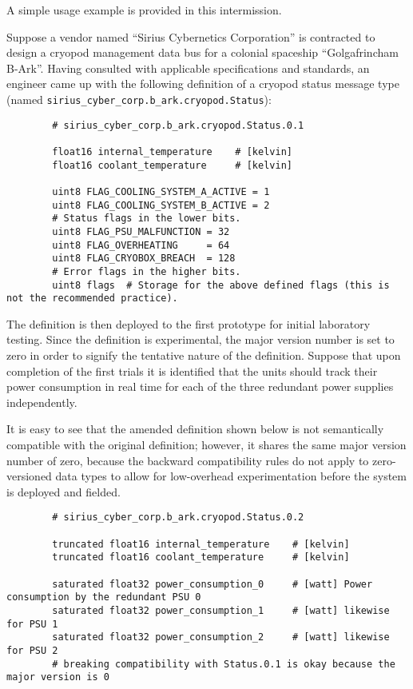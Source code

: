 \begin{remark}[breakable]
    A simple usage example is provided in this intermission.

    Suppose a vendor named ``Sirius Cybernetics Corporation'' is contracted to design a
    cryopod management data bus for a colonial spaceship ``Golgafrincham B-Ark''.
    Having consulted with applicable specifications and standards, an engineer came up with the following
    definition of a cryopod status message type (named \verb|sirius_cyber_corp.b_ark.cryopod.Status|):

    \begin{verbatim}
        # sirius_cyber_corp.b_ark.cryopod.Status.0.1

        float16 internal_temperature    # [kelvin]
        float16 coolant_temperature     # [kelvin]

        uint8 FLAG_COOLING_SYSTEM_A_ACTIVE = 1
        uint8 FLAG_COOLING_SYSTEM_B_ACTIVE = 2
        # Status flags in the lower bits.
        uint8 FLAG_PSU_MALFUNCTION = 32
        uint8 FLAG_OVERHEATING     = 64
        uint8 FLAG_CRYOBOX_BREACH  = 128
        # Error flags in the higher bits.
        uint8 flags  # Storage for the above defined flags (this is not the recommended practice).
    \end{verbatim}

    The definition is then deployed to the first prototype for initial laboratory testing.
    Since the definition is experimental, the major version number is set to zero in order to signify the
    tentative nature of the definition.
    Suppose that upon completion of the first trials it is identified that the units should track their
    power consumption in real time for each of the three redundant power supplies independently.

    It is easy to see that the amended definition shown below is not semantically compatible
    with the original definition; however, it shares the same major version number of zero, because the backward
    compatibility rules do not apply to zero-versioned data types to allow for low-overhead experimentation
    before the system is deployed and fielded.

    \begin{verbatim}
        # sirius_cyber_corp.b_ark.cryopod.Status.0.2

        truncated float16 internal_temperature    # [kelvin]
        truncated float16 coolant_temperature     # [kelvin]

        saturated float32 power_consumption_0     # [watt] Power consumption by the redundant PSU 0
        saturated float32 power_consumption_1     # [watt] likewise for PSU 1
        saturated float32 power_consumption_2     # [watt] likewise for PSU 2
        # breaking compatibility with Status.0.1 is okay because the major version is 0


\end{verbatim}
\end{remark}
